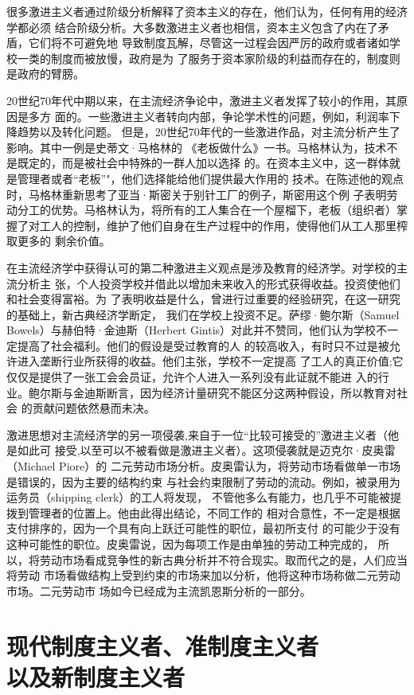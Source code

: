 很多激进主义者通过阶级分析解释了资本主义的存在，他们认为，任何有用的经济学都必须
结合阶级分析。大多数激进主义者也相信，资本主义包含了内在了矛盾，它们将不可避免地
导致制度瓦解，尽管这一过程会因严厉的政府或者诸如学校一类的制度而被放慢，政府是为
了服务于资本家阶级的利益而存在的，制度则是政府的臂膀。

20世纪70年代中期以来，在主流经济争论中，激进主义者发挥了较小的作用，其原因是多方
面的。一些激进主义者转向内部，争论学术性的问题，例如，利润率下降趋势以及转化问题。
但是，20世纪70年代的一些激进作品，对主流分析产生了影响。其中一例是史蒂文·马格林的
《老板做什么》一书。马格林认为，技术不是既定的，而是被社会中特殊的一群人加以选择
的。在资本主义中，这一群体就是管理者或者“老板”"，他们选择能给他们提供最大作用的
技术。在陈述他的观点时，马格林重新思考了亚当·斯密关于别针工厂的例子，斯密用这个例
子表明劳动分工的优势。马格林认为，将所有的工人集合在一个屋榴下，老板（组织者）掌
握了对工人的控制，维护了他们自身在生产过程中的作用，使得他们从工人那里榨取更多的
剩余价值。

在主流经济学中获得认可的第二种激进主义观点是涉及教育的经济学。对学校的主流分析主
张，个人投资学校并借此以增加未来收入的形式获得收益。投资使他们和社会变得富裕。为
了表明收益是什么，曾进行过重要的经验研究，在这一研究的基础上，新古典经济学断定，
我们在学校上投资不足。萨缪·鲍尔斯（Samuel Bowels）与赫伯特·金迪斯（Herbert
Gintis）对此并不赞同，他们认为学校不一定提高了社会福利。他们的假设是受过教育的人
的较高收入，有时只不过是被允许进入垄断行业所获得的收益。他们主张，学校不一定提高
了工人的真正价值;它仅仅是提供了一张工会会员证，允许个人进入一系列没有此证就不能进
入的行业。鲍尔斯与金迪斯断言，因为经济计量研究不能区分这两种假设，所以教育对社会
的贡献问题依然悬而未决。

激进思想对主流经济学的另一项侵袭,来自于一位“比较可接受的”激进主义者（他是如此可
接受,以至可以不被看做是激进主义者）。这项侵袭就是迈克尔·皮奥雷（Michael Piore）的
二元劳动市场分析。皮奥雷认为，将劳动市场看做单一市场是错误的，因为主要的结构约束
与社会约束限制了劳动的流动。例如，被录用为运务员（shipping clerk）的工人将发现，
不管他多么有能力，也几乎不可能被提拨到管理者的位置上。他由此得出结论，不同工作的
相对合意性，不一定是根据支付排序的，因为一个具有向上跃迁可能性的职位，最初所支付
的可能少于没有这种可能性的职位。皮奥雷说，因为每项工作是由单独的劳动工种完成的，
所以，将劳动市场看成竞争性的新古典分析并不符合现实。取而代之的是，人们应当将劳动
市场看做结构上受到约束的市场来加以分析，他将这种市场称做二元劳动市场。二元劳动市
场如今已经成为主流凯恩斯分析的一部分。

\section{现代制度主义者、准制度主义者\\以及新制度主义者}

